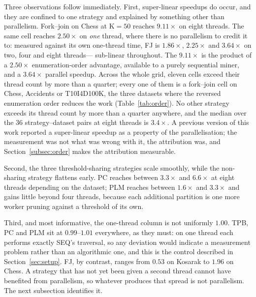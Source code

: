 \documentclass[pdflatex,sn-vancouver-num]{sn-jnl}
\theoremstyle{thmstyleone}%
\theoremstyle{thmstyletwo}%
\theoremstyle{thmstylethree}%
\newcommand{\Kk}{\mathrm{K}}
\begin{document}
Three observations follow immediately. First, super-linear speedups do
occur, and they are confined to one strategy and explained by something
other than parallelism. Fork--join on Chess at $\Kk=50$ reaches
$9.11\times$ on eight threads. The same cell reaches $2.50\times$ on
\emph{one} thread, where there is no parallelism to credit it to:
measured against its own one-thread time, FJ is $1.86\times$,
$2.25\times$ and $3.64\times$ on two, four and eight threads---
sub-linear throughout. The $9.11\times$ is the product of a
$2.50\times$ enumeration-order advantage, available to a purely
sequential miner, and a $3.64\times$ parallel speedup. Across the whole
grid, eleven cells exceed their thread count by more than a quarter;
every one of them is a fork--join cell on Chess, Accidents or
T10I4D100K, the three datasets where the reversed enumeration order
reduces the work (Table~\ref{tab:order}). No other strategy exceeds its
thread count by more than a quarter anywhere, and the median over the
$36$ strategy--dataset pairs at eight threads is $3.4\times$. A previous
version of this work reported a super-linear speedup as a property of
the parallelisation; the measurement was not what was wrong with it, the
attribution was, and Section~\ref{subsec:order} makes the attribution
measurable.
 
Second, the three threshold-sharing strategies scale smoothly, while the
non-sharing strategy flattens early. PC reaches between $3.3\times$ and
$6.6\times$ at eight threads depending on the dataset; PLM reaches
between $1.6\times$ and $3.3\times$ and gains little beyond four threads,
because each additional partition is one more worker pruning against a
threshold of its own.
 
Third, and most informative, the one-thread column is not uniformly
$1.00$. TPB, PC and PLM sit at $0.99$--$1.01$ everywhere, as they must:
on one thread each performs exactly SEQ's traversal, so any deviation
would indicate a measurement problem rather than an algorithmic one, and
this is the control described in Section~\ref{sec:setup}. FJ, by
contrast, ranges from $0.53$ on Kosarak to $1.96$ on Chess. A strategy
that has not yet been given a second thread cannot have benefited from
parallelism, so whatever produces that spread is not parallelism. The
next subsection identifies it.
 
\end{document}
